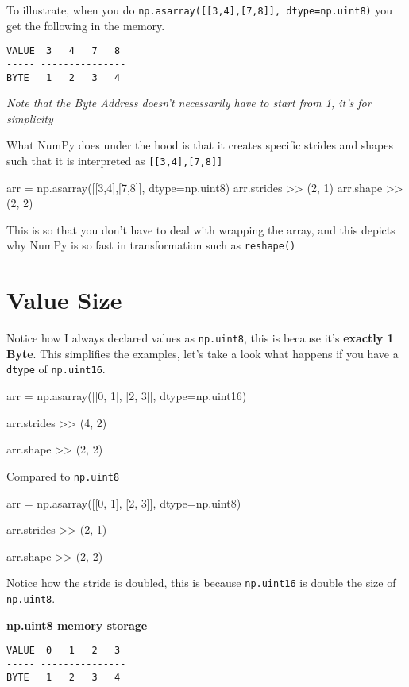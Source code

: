 \documentclass[oneside, 12pt]{report}
\begin{document}
To illustrate, when you do \verb+np.asarray([[3,4],[7,8]], dtype=np.uint8)+ you get the following in the memory.

\begin{verbatim}
VALUE  3   4   7   8
----- ---------------
BYTE   1   2   3   4
\end{verbatim}

\textit{Note that the Byte Address doesn't necessarily have to start from 1, it's for simplicity}

What NumPy does under the hood is that it creates specific strides and shapes such that it is interpreted as \verb+[[3,4],[7,8]]+

\begin{python}
arr = np.asarray([[3,4],[7,8]], dtype=np.uint8)
arr.strides
>> (2, 1)
arr.shape
>> (2, 2)
\end{python}

This is so that you don't have to deal with wrapping the array, and this depicts why NumPy is so fast in transformation such as \verb+reshape()+

\section{Value Size}

Notice how I always declared values as \verb+np.uint8+, this is because it's \textbf{exactly 1 Byte}. This simplifies the examples, let's take a look what happens if you have a \verb+dtype+ of \verb+np.uint16+.

\begin{python}
arr = np.asarray([[0, 1], [2, 3]], dtype=np.uint16)

arr.strides
>> (4, 2)

arr.shape
>> (2, 2)
\end{python}

Compared to \verb+np.uint8+

\begin{python}
arr = np.asarray([[0, 1], [2, 3]], dtype=np.uint8)

arr.strides
>> (2, 1)

arr.shape
>> (2, 2)
\end{python}

Notice how the stride is doubled, this is because \verb+np.uint16+ is double the size of \verb+np.uint8+.

\textbf{np.uint8 memory storage}
\begin{verbatim}
VALUE  0   1   2   3
----- ---------------
BYTE   1   2   3   4
\end{verbatim}
\end{document}
